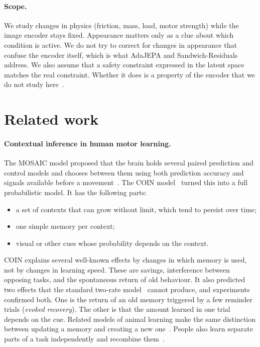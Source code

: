 \documentclass[10pt]{article}
\begin{document}
\paragraph{Scope.}
We study changes in physics (friction, mass, load, motor strength) while the image encoder stays fixed.
Appearance matters only as a clue about which condition is active. We do not try to correct for
changes in appearance that confuse the encoder itself, which is what AdaJEPA and Sandwich-Residuals
address. We also assume that a safety constraint expressed in the latent space matches the real
constraint. Whether it does is a property of the encoder that we do not study here~\cite{lutkus2025latent}.

\section{Related work}

\paragraph{Contextual inference in human motor learning.}
The MOSAIC model proposed that the brain holds several paired prediction and control models and
chooses between them using both prediction accuracy and signals available before a
movement~\cite{wolpert1998multiple,haruno2001mosaic}. The COIN model~\cite{heald2021coin} turned this
into a full probabilistic model. It has the following parts:
\begin{itemize}
  \item a set of contexts that can grow without limit, which tend to persist over time;
  \item one simple memory per context;
  \item visual or other cues whose probability depends on the context.
\end{itemize}
COIN explains several well-known effects by changes in which memory is used, not by changes in
learning speed. These are savings, interference between opposing tasks, and the spontaneous return of
old behaviour. It also predicted two effects that the standard two-rate model~\cite{smith2006interacting}
cannot produce, and experiments confirmed both. One is the return of an old memory triggered by a few
reminder trials (\emph{evoked recovery}). The other is that the amount learned in one trial depends on
the cue. Related models of animal learning make the same distinction between updating a memory and
creating a new one~\cite{gershman2010context,gershman2014statistical,oh2019minimizing}. People also
learn separate parts of a task independently and recombine them~\cite{franklin2018compositional}.
\end{document}

